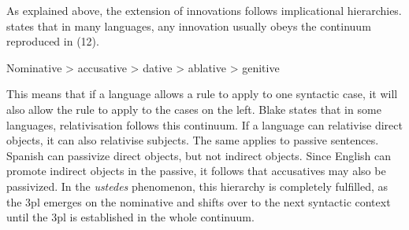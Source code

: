 \documentclass[output=paper]{LSP/langsci}
\begin{document}
\begin{table}
\label{tab:10}
\caption{Extension of the innovative 3pl in the ustedes phenomenon} 
\end{table}

As explained above, the extension of innovations follows implicational hierarchies. \citet{blake_case_2004} states that in many languages, any innovation usually obeys the continuum reproduced in (12).

\begin{exe}
\ex Nominative {\textgreater} accusative {\textgreater} dative {\textgreater} ablative {\textgreater} genitive
\end{exe}

This means that if a language allows a rule to apply to one syntactic case, it will also allow the rule to apply to the cases on the left. Blake states that in some languages, relativisation follows this continuum. If a language can relativise direct objects, it can also relativise subjects. The same applies to passive sentences. Spanish can passivize direct objects, but not indirect objects. Since English can promote indirect objects in the passive, it follows that accusatives may also be passivized. In the \textit{ustedes} phenomenon, this hierarchy is completely fulfilled, as the 3pl emerges on the nominative and shifts over to the next syntactic context until the 3pl is established in the whole continuum.
\end{document}
